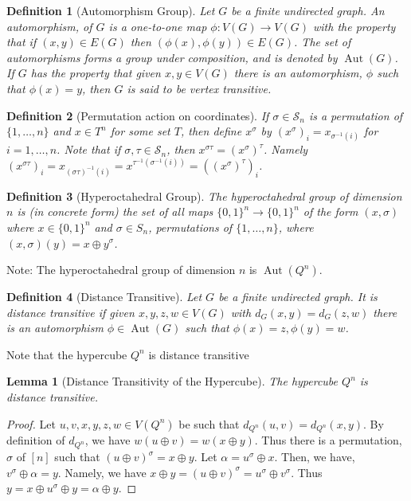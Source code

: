 \documentclass{article}
\DeclareMathOperator{\Aut}{Aut}
\newcommand{\cS}{\mathcal{S}}
\newtheorem{definition}{Definition}
\newtheorem{lemma}{Lemma}
\begin{document}
\begin{definition}[Automorphism Group]
  Let $G$ be a finite undirected graph.  An \emph{automorphism}, of
  $G$ is a one-to-one map $\phi: V(G) \rightarrow V(G)$ with the
  property that if $(x,y) \in E(G)$ then
  $(\phi(x), \phi(y)) \in E(G)$.  The set of automorphisms forms a
  group under composition, and is denoted by $\Aut(G)$.  If $G$ has
  the property that given $x, y \in V(G)$ there is an automorphism,
  $\phi$ such that $\phi(x) = y$, then $G$ is said to be \emph{vertex
    transitive}.
\end{definition}
\begin{definition}[Permutation action on coordinates]
  If $\sigma \in \cS_n$ is a permutation of $\{1, \dots, n\}$ and $x \in
  T^n$ for some set $T$, then define $x^\sigma$ by $(x^\sigma)_i =
  x_{\sigma^{-1}(i)}$ for $i=1, \dots, n$.  Note that if $\sigma, \tau
  \in \cS_n$, then $x^{\sigma \tau} = (x^{\sigma})^\tau$.  Namely
  $(x^{\sigma \tau})_i = x_{(\sigma \tau)^{-1}(i)} = x^{\tau^{-1}
    (\sigma^{-1}(i))} = ((x^\sigma)^\tau)_i$.
\end{definition}
\begin{definition}[Hyperoctahedral Group]
The \emph{hyperoctahedral group} of dimension $n$ is (in concrete
form) the set of all maps $\{0,1\}^n \rightarrow \{0,1\}^n$ of the
form $(x,\sigma)$ where $x \in \{0,1\}^n$ and $\sigma \in S_n$,
permutations of $\{1, \dots, n\}$, where $(x, \sigma) (y) = x \oplus
y^\sigma$.
  
\end{definition}
Note: The hyperoctahedral group of dimension $n$ is $\Aut(Q^n)$.

\begin{definition}[Distance Transitive]
Let $G$ be a finite undirected graph.  It is \emph{distance
  transitive} if given $x,y,z,w \in V(G)$ with $d_G(x,y) = d_G(z,w)$
there is an automorphism $\phi \in \Aut(G)$ such that $\phi(x) = z, \phi(y) = w$.
  
\end{definition}
Note that the hypercube $Q^n$ is distance transitive

\begin{lemma}[Distance Transitivity of the Hypercube]
  The hypercube $Q^n$ is distance transitive.
\end{lemma}
\begin{proof}
  Let $u,v,x,y,z,w \in V(Q^n)$ be such that $d_{Q^n}(u,v) = d_{Q^n}(x,y)$.
  By definition of $d_{Q^n}$, we have $w(u \oplus v) = w(x \oplus y)$.
  Thus there is a permutation, $\sigma$ of $[n]$ such that
  $(u \oplus v)^\sigma = x \oplus y$.  Let $\alpha = u^\sigma \oplus
  x$.  Then, we have, $v^\sigma \oplus \alpha = y$.  Namely, we have
  $x \oplus y = (u \oplus v)^\sigma = u^\sigma \oplus v^\sigma$.  Thus
  $y = x \oplus u^\sigma \oplus y = \alpha \oplus y$.
\end{proof}
\end{document}
